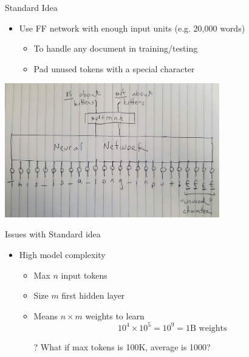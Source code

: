 \documentclass[aspectratio=169]{beamer}
\begin{document}
\begin{frame}{Standard Idea}

\begin{itemize}
	\item Use FF network with enough input units (e.g. 20,000 words)
	\begin{itemize}
	\item To handle any document in training/testing
	\item Pad unused tokens with a special character
	\end{itemize}
\end{itemize}
\includegraphics[width=0.7\textwidth]{lectRNN/wide_net.jpg}
\end{frame}
\begin{frame}{Issues with Standard idea}

\begin{itemize}
	\item High model complexity
	\begin{itemize}
	\item Max $n$ input tokens
	\item Size $m$ first hidden layer
	\item Means $n \times m$ weights to learn
	$$10^4 \times 10^5 = 10^9 = 1\text{B weights}$$
	\item[?] What if max tokens is 100K, average is 1000?
	\end{itemize}
\end{itemize}
\end{frame}
\end{document}
